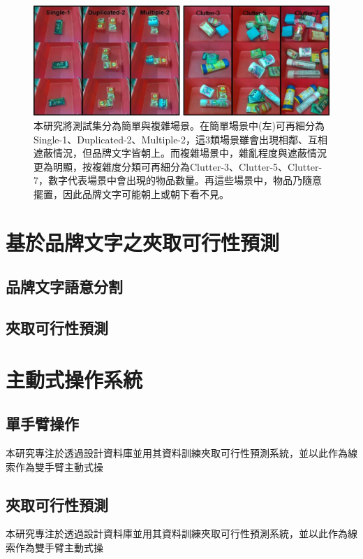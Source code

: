\begin{figure}[ht]
	\centering
	\includegraphics[height=!, width=1.0\linewidth, keepaspectratio=true]
	{./figures/testset.jpg}
  \caption{本研究將測試集分為簡單與複雜場景。在簡單場景中(左)可再細分為Single-1、Duplicated-2、Multiple-2，這3類場景雖會出現相鄰、互相遮蔽情況，但品牌文字皆朝上。而複雜場景中，雜亂程度與遮蔽情況更為明顯，按複雜度分類可再細分為Clutter-3、Clutter-5、Clutter-7，數字代表場景中會出現的物品數量。再這些場景中，物品乃隨意擺置，因此品牌文字可能朝上或朝下看不見。}
  \label{figure:testset}
\end{figure}

\section{基於品牌文字之夾取可行性預測}

\subsection{品牌文字語意分割}

\subsection{夾取可行性預測}

\section{主動式操作系統}

\subsection{單手臂操作}
本研究專注於透過設計資料庫並用其資料訓練夾取可行性預測系統，並以此作為線索作為雙手臂主動式操

\subsection{夾取可行性預測}
本研究專注於透過設計資料庫並用其資料訓練夾取可行性預測系統，並以此作為線索作為雙手臂主動式操
